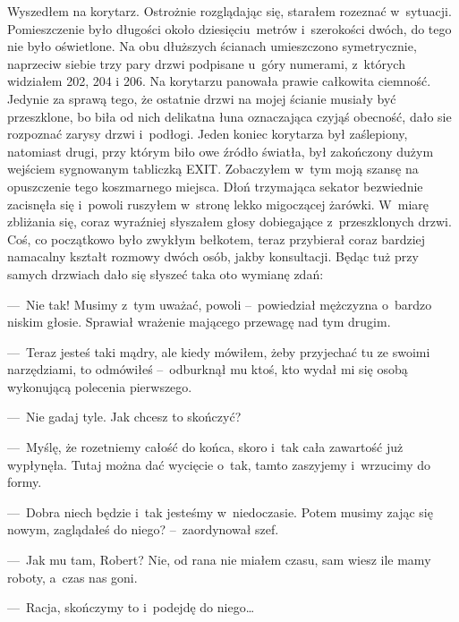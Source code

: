 Wyszedłem na korytarz. Ostrożnie rozglądając się, starałem rozeznać w~sytuacji. Pomieszczenie było długości około dziesięciu~metrów i~szerokości dwóch, do tego nie było oświetlone. Na obu dłuższych ścianach umieszczono symetrycznie, naprzeciw siebie trzy pary drzwi podpisane u~góry numerami, z~których widziałem 202, 204 i 206. Na korytarzu panowała prawie całkowita ciemność. Jedynie za sprawą tego, że ostatnie drzwi na mojej ścianie musiały być przeszklone, bo biła od nich delikatna łuna oznaczająca czyjąś obecność, dało sie rozpoznać zarysy drzwi i~podłogi. Jeden koniec korytarza był zaślepiony, natomiast drugi, przy którym biło owe źródło światła, był zakończony dużym wejściem sygnowanym tabliczką EXIT. Zobaczyłem w~tym moją szansę na opuszczenie tego koszmarnego miejsca. Dłoń trzymająca sekator bezwiednie zacisnęła się i~powoli ruszyłem w~stronę lekko migoczącej żarówki. W~miarę zbliżania się, coraz wyraźniej słyszałem głosy dobiegające z~przeszklonych drzwi. Coś, co początkowo było zwykłym bełkotem, teraz przybierał coraz bardziej namacalny kształt rozmowy dwóch osób, jakby konsultacji. Będąc tuż przy samych drzwiach dało się słyszeć taka oto wymianę zdań:

---~Nie tak! Musimy z~tym uważać, powoli --~powiedział mężczyzna o~bardzo niskim głosie. Sprawiał wrażenie mającego przewagę nad tym drugim. 

---~Teraz jesteś taki mądry, ale kiedy mówiłem, żeby przyjechać tu ze swoimi narzędziami, to odmówiłeś --~odburknął mu ktoś, kto wydał mi się osobą wykonującą polecenia pierwszego. 

---~Nie gadaj tyle. Jak chcesz to skończyć? 

---~Myślę, że rozetniemy całość do końca, skoro i~tak cała zawartość już wypłynęła. Tutaj można dać wycięcie o~tak, tamto zaszyjemy i~wrzucimy do formy. 

---~Dobra niech będzie i~tak jesteśmy w~niedoczasie. Potem musimy zając się nowym, zaglądałeś do niego? --~zaordynował szef.

---~Jak mu tam, Robert? Nie, od rana nie miałem czasu, sam wiesz ile mamy roboty, a~czas nas goni. 

---~Racja, skończymy to i~podejdę do niego… 


